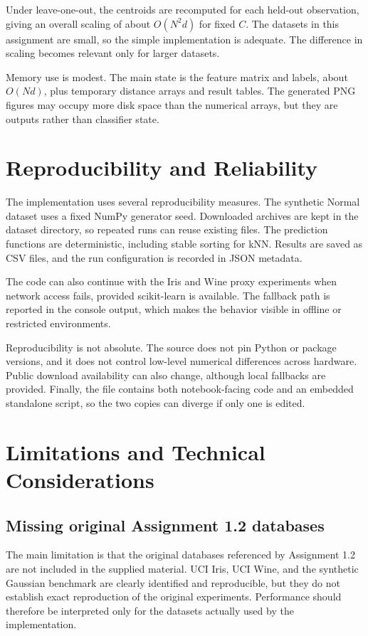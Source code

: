 \documentclass[11pt,a4paper]{article}
\begin{document}
Under leave-one-out, the centroids are recomputed for each held-out observation, giving an overall scaling of about $O(N^2d)$ for fixed $C$. The datasets in this assignment are small, so the simple implementation is adequate. The difference in scaling becomes relevant only for larger datasets.

Memory use is modest. The main state is the feature matrix and labels, about $O(Nd)$, plus temporary distance arrays and result tables. The generated PNG figures may occupy more disk space than the numerical arrays, but they are outputs rather than classifier state.

\section{Reproducibility and Reliability}

The implementation uses several reproducibility measures. The synthetic Normal dataset uses a fixed NumPy generator seed. Downloaded archives are kept in the dataset directory, so repeated runs can reuse existing files. The prediction functions are deterministic, including stable sorting for kNN. Results are saved as CSV files, and the run configuration is recorded in JSON metadata.

The code can also continue with the Iris and Wine proxy experiments when network access fails, provided scikit-learn is available. The fallback path is reported in the console output, which makes the behavior visible in offline or restricted environments.

Reproducibility is not absolute. The source does not pin Python or package versions, and it does not control low-level numerical differences across hardware. Public download availability can also change, although local fallbacks are provided. Finally, the file contains both notebook-facing code and an embedded standalone script, so the two copies can diverge if only one is edited.

\section{Limitations and Technical Considerations}

\subsection{Missing original Assignment 1.2 databases}

The main limitation is that the original databases referenced by Assignment 1.2 are not included in the supplied material. UCI Iris, UCI Wine, and the synthetic Gaussian benchmark are clearly identified and reproducible, but they do not establish exact reproduction of the original experiments. Performance should therefore be interpreted only for the datasets actually used by the implementation.
\end{document}
